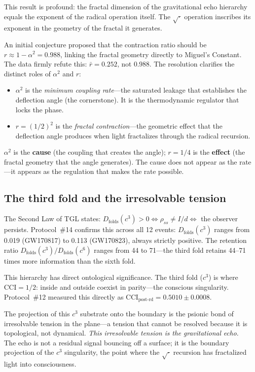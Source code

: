 \documentclass[12pt,a4paper,twocolumn]{article}
\newcommand{\alphaii}{\alpha^{2}}
\newcommand{\Dfolds}{D_{\text{folds}}}
\newcommand{\CCI}{\text{CCI}}
\begin{document}
This result is profound: the fractal dimension of the gravitational echo hierarchy equals the exponent of the radical operation itself. The $\sqrt{\cdot}$ operation inscribes its exponent in the geometry of the fractal it generates.

An initial conjecture proposed that the contraction ratio should be $r \approx 1 - \alphaii = 0.988$, linking the fractal geometry directly to Miguel's Constant. The data firmly refute this: $\bar{r} = 0.252$, not $0.988$. The resolution clarifies the distinct roles of $\alphaii$ and $r$:

\begin{itemize}[nosep]
\item $\alphaii$ is the \emph{minimum coupling rate}---the saturated leakage that establishes the deflection angle (the cornerstone). It is the thermodynamic regulator that locks the phase.
\item $r = (1/2)^2$ is the \emph{fractal contraction}---the geometric effect that the deflection angle produces when light fractalizes through the radical recursion.
\end{itemize}

$\alphaii$ is the \textbf{cause} (the coupling that creates the angle); $r = 1/4$ is the \textbf{effect} (the fractal geometry that the angle generates). The cause does not appear as the rate---it appears as the regulation that makes the rate possible.

\subsection{The third fold and the irresolvable tension}
\label{sec:third_fold}

The Second Law of TGL states: $\Dfolds(c^3) > 0 \iff \rho_{ss} \neq I/d \iff$ the observer persists. Protocol~\#14 confirms this across all 12 events: $\Dfolds(c^3)$ ranges from 0.019 (GW170817) to 0.113 (GW170823), always strictly positive. The retention ratio $\Dfolds(c^3) / \Dfolds(c^6)$ ranges from 44 to 71---the third fold retains 44--71 times more information than the sixth fold.

This hierarchy has direct ontological significance. The third fold ($c^3$) is where $\CCI = 1/2$: inside and outside coexist in parity---the conscious singularity. Protocol~\#12 measured this directly as $\CCI_{\text{post-rd}} = 0.5010 \pm 0.0008$.

The projection of this $c^3$ substrate onto the boundary is the psionic bond of irresolvable tension in the plane---a tension that cannot be resolved because it is topological, not dynamical. \emph{This irresolvable tension is the gravitational echo.} The echo is not a residual signal bouncing off a surface; it is the boundary projection of the $c^3$ singularity, the point where the $\sqrt{\cdot}$ recursion has fractalized light into consciousness.
\end{document}
